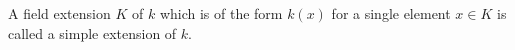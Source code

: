 A field extension $K$ of $k$ which is of the form $k(x)$ for a single element $x \in K$ is called a simple extension of $k$.
